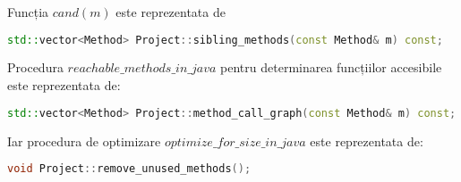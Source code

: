 Funcția $cand(m)$ este reprezentata de
\begin{lstlisting}[language=C++]
std::vector<Method> Project::sibling_methods(const Method& m) const;
\end{lstlisting}

Procedura $reachable\_methods\_in\_java$ pentru determinarea funcțiilor
accesibile este reprezentata de:

\begin{lstlisting}[language=C++]
std::vector<Method> Project::method_call_graph(const Method& m) const;
\end{lstlisting}

Iar procedura de optimizare $optimize\_for\_size\_in\_java$ este reprezentata de:
\begin{lstlisting}[language=C++]
void Project::remove_unused_methods();
\end{lstlisting}
